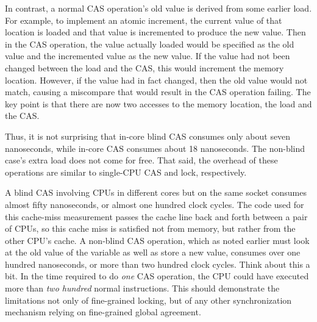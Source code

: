 In contrast, a normal CAS operation's old value is derived from
some earlier load.
For example, to implement an atomic increment, the current value of
that location is loaded and that value is incremented to produce the
new value.
Then in the CAS operation, the value actually loaded would be specified
as the old value and the incremented value as the new value.
If the value had not been changed between the load and the CAS, this
would increment the memory location.
However, if the value had in fact changed, then the old value would
not match, causing a miscompare that would result in the CAS operation
failing.
The key point is that there are now two accesses to the memory location,
the load and the CAS\@.

Thus, it is not surprising that in-core blind CAS consumes only about
seven nanoseconds, while in-core CAS consumes about 18 nanoseconds.
The non-blind case's extra load does not come for free.
That said, the overhead of these operations are similar to single-CPU
CAS and lock, respectively.

\QuickQuizEnd

A blind CAS involving CPUs in different cores but on the same socket
consumes almost fifty nanoseconds, or almost one hundred clock cycles.
The code used for this cache-miss measurement passes the cache line
back and forth between a pair of CPUs, so this cache miss is satisfied
not from memory, but rather from the other CPU's cache.
A non-blind CAS operation, which as noted earlier must look at the old
value of the variable as well as store a new value, consumes over one
hundred nanoseconds, or more than two hundred clock cycles.
Think about this a bit.
In the time required to do \emph{one} CAS operation, the CPU could have
executed more than \emph{two hundred} normal instructions.
This should demonstrate the limitations not only of fine-grained locking,
but of any other synchronization mechanism relying on fine-grained
global agreement.

